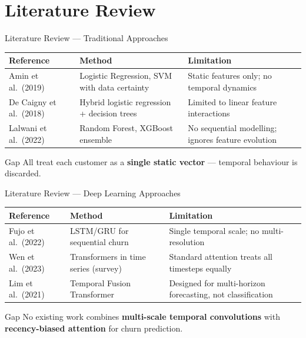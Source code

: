 \documentclass[aspectratio=169,11pt]{beamer}
\begin{document}
\section{Literature Review}

\begin{frame}{Literature Review — Traditional Approaches}
\begin{table}[h]
\centering
\small
\begin{tabular}{p{3.2cm} p{4.5cm} p{4.5cm}}
\toprule
\textbf{Reference} & \textbf{Method} & \textbf{Limitation} \\
\midrule
Amin et al.\ (2019) \cite{amin2019} & Logistic Regression, SVM with data certainty & Static features only; no temporal dynamics \\[4pt]
De Caigny et al.\ (2018) \cite{decaigny2018} & Hybrid logistic regression + decision trees & Limited to linear feature interactions \\[4pt]
Lalwani et al.\ (2022) \cite{lalwani2022} & Random Forest, XGBoost ensemble & No sequential modelling; ignores feature evolution \\
\bottomrule
\end{tabular}
\end{table}
\vspace{4pt}
\begin{alertblock}{Gap}
All treat each customer as a \textbf{single static vector} — temporal behaviour is discarded.
\end{alertblock}
\end{frame}

\begin{frame}{Literature Review — Deep Learning Approaches}
\begin{table}[h]
\centering
\small
\begin{tabular}{p{3.2cm} p{4.5cm} p{4.5cm}}
\toprule
\textbf{Reference} & \textbf{Method} & \textbf{Limitation} \\
\midrule
Fujo et al.\ (2022) \cite{fujo2022} & LSTM/GRU for sequential churn & Single temporal scale; no multi-resolution \\[4pt]
Wen et al.\ (2023) \cite{wen2023} & Transformers in time series (survey) & Standard attention treats all timesteps equally \\[4pt]
Lim et al.\ (2021) \cite{lim2021} & Temporal Fusion Transformer & Designed for multi-horizon forecasting, not classification \\
\bottomrule
\end{tabular}
\end{table}
\vspace{4pt}
\begin{alertblock}{Gap}
No existing work combines \textbf{multi-scale temporal convolutions} with \textbf{recency-biased attention} for churn prediction.
\end{alertblock}
\end{frame}
\end{document}
